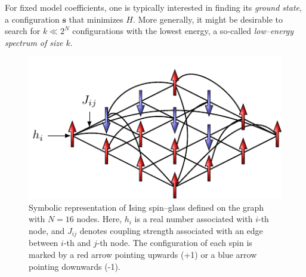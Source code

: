 For fixed model coefficients, one is typically interested in finding its \emph{ground state}, a
configuration $\mathbf{s}$ that minimizes $H$. More generally, it might be desirable to search for
$k \ll 2^N$ configurations with the lowest energy, a so-called \emph{low--energy spectrum of size $k$}.

\begin{figure}[H]
    \centering
    \includegraphics{figures/spins.pdf}
    \caption{Symbolic representation of Ising spin--glass defined on the graph with $N=16$ nodes. Here, $h_i$ is a real number associated with $i$-th node, and $J_{ij}$ denotes coupling strength associated with an edge between $i$-th and $j$-th node. The configuration of each spin is marked by a red arrow pointing upwards (+1) or a blue arrow pointing downwards (-1).}
    \label{fig:my_label}
\end{figure}

